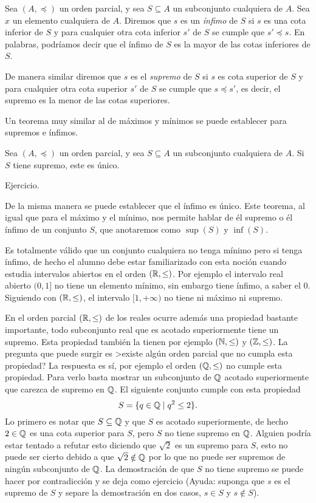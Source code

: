 \begin{definicion}
Sea $(A,\preceq)$ un orden parcial, y sea $S\subseteq A$ un subconjunto cualquiera de $A$.
Sea $x$ un elemento cualquiera de $A$.
Diremos que $s$ es un \emph{ínfimo} de $S$ si $s$ es una cota inferior  de $S$ y para cualquier otra cota inferior $s'$ de $S$ se cumple que $s'\preceq s$.
En palabras, podríamos decir que el ínfimo de $S$ es la mayor de las cotas inferiores de $S$.

De manera similar diremos que $s$ es el \emph{supremo} de $S$ si $s$ es cota superior de $S$ y para cualquier otra cota superior $s'$ de $S$ se cumple que $s\preceq s'$, es decir, el supremo es la menor de las cotas superiores.
\end{definicion}

Un teorema muy similar al de máximos y mínimos se puede establecer para supremos e ínfimos.

\begin{teorema}
Sea $(A,\preceq)$ un orden parcial, y sea $S\subseteq A$ un subconjunto cualquiera de $A$.
Si $S$ tiene supremo, este es único.

\begin{demostracion}
Ejercicio.
\end{demostracion}

De la misma manera se puede establecer que el ínfimo es único.
Este teorema, al igual que para el máximo y el mínimo, nos permite hablar de él supremo o él ínfimo de un conjunto $S$, que anotaremos como $\sup(S)$ y $\inf(S)$.
\end{teorema}

Es totalmente válido que un conjunto cualquiera no tenga mínimo pero si tenga ínfimo, de hecho el alumno debe estar familiarizado con esta noción cuando estudia intervalos abiertos en el orden $(\mathbb{R},\leq)$.
Por ejemplo el intervalo real abierto $(0,1]$ no tiene un elemento mínimo, sin embargo tiene ínfimo, a saber el $0$.
Siguiendo con $(\mathbb{R},\leq)$, el intervalo $[1,+\infty)$ no tiene ni máximo ni supremo.

En el orden parcial $(\mathbb{R},\leq)$ de los reales ocurre además una propiedad bastante importante, todo subconjunto real que es acotado superiormente tiene un supremo.
Esta propiedad también la tienen por ejemplo \mbox{$(\mathbb{N},\leq)$} y $(\mathbb{Z},\leq)$.
La pregunta que puede surgir es >existe algún orden parcial que no cumpla esta propiedad?
La respuesta es sí, por ejemplo el orden $(\mathbb{Q},\leq)$ no cumple esta propiedad.
Para verlo basta mostrar un subconjunto de $\mathbb{Q}$ acotado superiormente que carezca de supremo en $\mathbb{Q}$.
El siguiente conjunto cumple con esta propiedad
\[
S=\{q\in\mathbb{Q}\;|\;q^2\leq 2\}.
\]
Lo primero es notar que $S\subseteq\mathbb{Q}$ y que $S$ es acotado superiormente, de hecho $2\in\mathbb{Q}$ es una cota superior para $S$, pero $S$ no tiene supremo en $\mathbb{Q}$.
Alguien podría estar tentado a refutar esto diciendo que $\sqrt{2}$ es un supremo para $S$, esto no puede ser cierto debido a que $\sqrt{2}\notin\mathbb{Q}$ por lo que no puede ser supremos de ningún subconjunto de $\mathbb{Q}$.
La demostración de que $S$ no tiene supremo se puede hacer por contradicción y se deja como ejercicio (Ayuda: suponga que $s$ es el supremo de $S$ y separe la demostración en dos casos, $s\in S$ y $s\notin S$).

